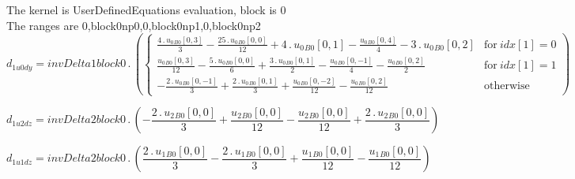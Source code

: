 \documentclass{article}
\begin{document}
\noindent The kernel is UserDefinedEquations evaluation, block is 0\\\noindent The ranges are 0,block0np0,0,block0np1,0,block0np2\\\begin{dmath}d_{1 u0 dy} = invDelta1block0 \,.\, \left(\begin{cases} \frac{4 \,.\, {u_{0}{_{B0}}}[{0,3}]}{3} - \frac{25 \,.\, {u_{0}{_{B0}}}[{0,0}]}{12} + 4 \,.\, {u_{0}{_{B0}}}[{0,1}] - \frac{{u_{0}{_{B0}}}[{0,4}]}{4} - 3 \,.\, {u_{0}{_{B0}}}[{0,2}] 
& \text{for}\: {idx}[{1}] = 0 \\\frac{{u_{0}{_{B0}}}[{0,3}]}{12} - \frac{5 \,.\, {u_{0}{_{B0}}}[{0,0}]}{6} + \frac{3 \,.\, {u_{0}{_{B0}}}[{0,1}]}{2} - \frac{{u_{0}{_{B0}}}[{0,-1}]}{4} - \frac{{u_{0}{_{B0}}}[{0,2}]}{2} & \text{for}\: {idx}[{1}] = 1 
\\- \frac{2 \,.\, {u_{0}{_{B0}}}[{0,-1}]}{3} + \frac{2 \,.\, {u_{0}{_{B0}}}[{0,1}]}{3} + \frac{{u_{0}{_{B0}}}[{0,-2}]}{12} - \frac{{u_{0}{_{B0}}}[{0,2}]}{12} & \text{otherwise} \end{cases}\right)\end{dmath}

\begin{dmath}d_{1 u2 dz} = invDelta2block0 \,.\, \left(- \frac{2 \,.\, {u_{2}{_{B0}}}[{0,0}]}{3} + \frac{{u_{2}{_{B0}}}[{0,0}]}{12} - \frac{{u_{2}{_{B0}}}[{0,0}]}{12} + \frac{2 \,.\, {u_{2}{_{B0}}}[{0,0}]}{3}\right)\end{dmath}

\begin{dmath}d_{1 u1 dz} = invDelta2block0 \,.\, \left(\frac{2 \,.\, {u_{1}{_{B0}}}[{0,0}]}{3} - \frac{2 \,.\, {u_{1}{_{B0}}}[{0,0}]}{3} + \frac{{u_{1}{_{B0}}}[{0,0}]}{12} - \frac{{u_{1}{_{B0}}}[{0,0}]}{12}\right)\end{dmath}
\end{document}

